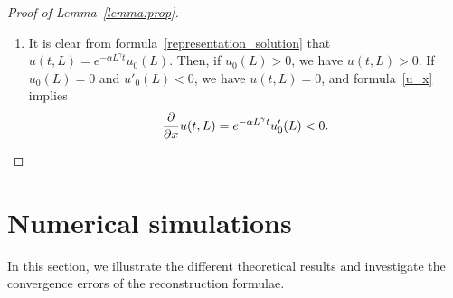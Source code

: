 \documentclass[AHL,Unicode,longabstracts,published]{cedram}
\newcommand*\eps{\varepsilon}
\newcommand*\p{\partial}
\renewcommand*\a{\alpha}
\newcommand*\supp{{\mbox{\small\rm supp}}\,}
\begin{document}
\begin{proof}[Proof of Lemma~\ref{lemma:prop}]
\begin{enumerate}
\begin{equation*}
Y'(t) \geq -\a y^{\gamma} Y(t),
\end{equation*}
i.e.
\begin{equation*}
u(t,y)= Y(t) \geq e^{-\a y^{\gamma}t} Y(0)=e^{-\a y^{\gamma}t} u_0(y).
\end{equation*}
If $u_0(y)\neq 0$, then for all $t\geq 0$, $u(t,y)\neq 0$. If $u_0(y)= 0$, since $y\in \supp(u_0)$, for all $\eps>0$, there exists $y_{\eps}$ such that $|y-y_{\eps}|<\eps$ and $u_0(y_{\eps})\neq 0$ and then $u(t,y_{\eps})\neq 0$, which implies that $y\in \supp(u(t,.))$. Thus $\supp(u(t,.))=[0,L]$.
\item It is clear from formula~\eqref{representation_solution} that $u(t,L)= e^{-\a L^{\gamma}t} u_0(L)$. Then, if $u_0(L)>0$, we have $u(t,L)>0$. If $u_0(L)=0$ and $u'_0(L)<0$, we have $u(t,L)= 0$, and formula~\eqref{u_x} implies
\begin{equation*}
\dfrac{\p}{\p x}u(t,L)= e^{-\a L^{\gamma}t}u'_0(L) <0.\qedhere
\end{equation*}
\end{enumerate}
\end{proof}




\section{Numerical simulations}

In this section, we illustrate the different theoretical results and investigate the convergence errors of the reconstruction formulae.
\end{document}
